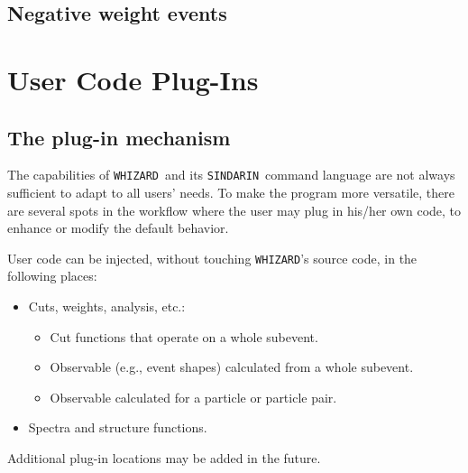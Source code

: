 \documentclass[12pt]{book}
\newcommand{\whizard}{\texttt{WHIZARD}}
\newcommand{\sindarin}{\texttt{SINDARIN}}
\begin{document}

\section{Negative weight events}

\chapter{User Code Plug-Ins}
\label{sec:user}

\section{The plug-in mechanism}

The capabilities of \whizard\ and its \sindarin\ command
language are not always sufficient to adapt to all users' needs.  To
make the program more versatile, there are several spots in the
workflow where the user may plug in his/her own code, to enhance or
modify the default behavior.

User code can be injected, without touching \whizard's source code, in
the following places:
\begin{itemize}
\item
  Cuts, weights, analysis, etc.:
  \begin{itemize}
  \item
    Cut functions that operate on a whole subevent.
  \item
    Observable (e.g., event shapes) calculated from a whole subevent.
  \item
    Observable calculated for a particle or particle pair.
  \end{itemize}
\item
  Spectra and structure functions.
\end{itemize}
Additional plug-in locations may be added in the future.
\end{document}
